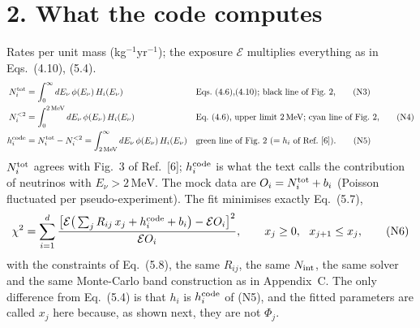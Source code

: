 \documentclass[11pt,a4paper]{article}
\newcommand{\Ev}{E_\nu}
\newcommand{\Hb}[1]{H_{#1}}
\newcommand{\Etwo}{2\,\mathrm{MeV}}
\begin{document}
\section*{2. What the code computes}
Rates per unit mass (kg$^{-1}$yr$^{-1}$); the exposure $\mathcal E$ multiplies everything as in Eqs.~(4.10), (5.4).
\begin{align}
N_i^{\rm tot}&=\int_0^\infty d\Ev\,\phi(\Ev)\,\Hb{i}(\Ev)
&&\text{Eqs.~(4.6),(4.10); black line of Fig.~2,}\tag{N3}\\
N_i^{<2}&=\int_0^{\Etwo}d\Ev\,\phi(\Ev)\,\Hb{i}(\Ev)
&&\text{Eq.~(4.6), upper limit $\Etwo$; cyan line of Fig.~2,}\tag{N4}\\
h_i^{\rm code}&=N_i^{\rm tot}-N_i^{<2}=\int_{\Etwo}^\infty d\Ev\,\phi(\Ev)\,\Hb{i}(\Ev)
&&\text{green line of Fig.~2 ($=h_i$ of Ref.~[6]).}\tag{N5}
\end{align}
$N_i^{\rm tot}$ agrees with Fig.~3 of Ref.~[6]; $h_i^{\rm code}$ is what the text calls the contribution of neutrinos with $\Ev>\Etwo$.
The mock data are $O_i=N_i^{\rm tot}+b_i$ (Poisson fluctuated per pseudo-experiment). The fit minimises exactly Eq.~(5.7),
\begin{equation}
\chi^2=\sum_{i=1}^{d}\frac{\big[\mathcal E\big(\sum_{j}R_{ij}\,x_j+h_i^{\rm code}+b_i\big)-\mathcal E O_i\big]^2}{\mathcal E O_i},
\qquad x_j\ge0,\ \ x_{j+1}\le x_j ,
\tag{N6}
\end{equation}
with the constraints of Eq.~(5.8), the same $R_{ij}$, the same $N_{\rm int}$, the same solver and the same Monte-Carlo band
construction as in Appendix~C. The only difference from Eq.~(5.4) is that $h_i$ is $h_i^{\rm code}$ of (N5), and the
fitted parameters are called $x_j$ here because, as shown next, they are not $\Phi_j$.
\end{document}
